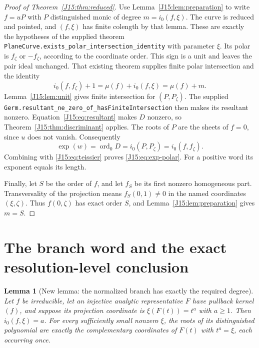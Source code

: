 \documentclass[11pt,oneside]{report}
\newtheorem{lemma}[theorem]{Lemma}
\theoremstyle{definition}
\numberwithin{equation}{section}
\newcommand{\decl}[1]{\textnormal{\nolinkurl{#1}}}
\newcommand{\ord}{\operatorname{ord}}
\newcommand{\Exp}{\operatorname{exp}}
\begin{document}
\begin{proof}[Proof of Theorem~\ref{J15:thm:reduced}]
Use Lemma~\ref{J15:lem:preparation} to write $f=uP$ with $P$ distinguished
monic of degree $m=i_0(f,\xi)$. The curve is reduced and pointed, and
$(f,\xi)$ has finite colength by that lemma. These are exactly the
hypotheses of the supplied theorem
\decl{PlaneCurve.exists_polar_intersection_identity} with parameter
$\xi$. Its polar is $f_\zeta$ or $-f_\zeta$, according to the coordinate
order. This sign is a unit and leaves the pair ideal unchanged. That existing
theorem supplies finite polar intersection and the identity
\begin{equation}\label{J15:eq:teissier}
 i_0(f,f_\zeta)+1=\mu(f)+i_0(f,\xi)=\mu(f)+m.
\end{equation}
Lemma~\ref{J15:lem:unit} gives finite intersection for $(P,P_\zeta)$.
The supplied \decl{Germ.resultant_ne_zero_of_hasFiniteIntersection}
then makes its resultant nonzero. Equation~\eqref{J15:eq:resultant} makes
$D$ nonzero, so Theorem~\ref{J15:thm:discriminant} applies.
The roots of $P$ are the sheets of $f=0$, since $u$ does not vanish.
Consequently
\[
 \Exp(w)=\ord_0 D=i_0(P,P_\zeta)=i_0(f,f_\zeta).
\]
Combining with \eqref{J15:eq:teissier} proves \eqref{J15:eq:exp-polar}.
For a positive word its exponent equals its length.

Finally, let $S$ be the order of $f$, and let $f_S$ be its first nonzero
homogeneous part. Transversality of the projection means
$f_S(0,1)\ne0$ in the named coordinates $(\xi,\zeta)$.
Thus $f(0,\zeta)$ has exact order $S$, and
Lemma~\ref{J15:lem:preparation} gives $m=S$.
\end{proof}

\section{The branch word and the exact resolution-level conclusion}

\begin{lemma}[New lemma: the normalized branch has exactly the required degree]
\label{J15:lem:branch-degree}
Let $f$ be irreducible, let an injective analytic representative $F$ have
pullback kernel $(f)$, and suppose its projection coordinate is
$\xi(F(t))=t^a$ with $a\ge1$. Then $i_0(f,\xi)=a$.
For every sufficiently small nonzero $\xi$, the roots of its distinguished
polynomial are exactly the complementary coordinates of
$F(t)$ with $t^a=\xi$, each occurring once.
\end{lemma}
\end{document}
